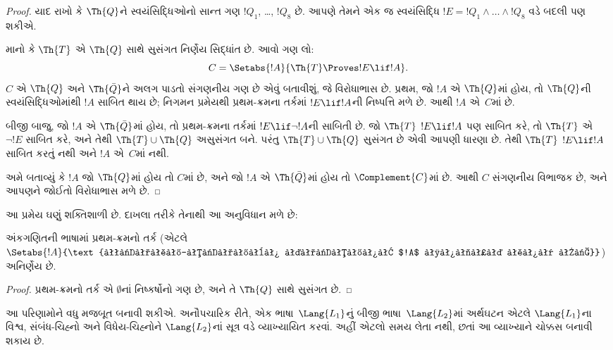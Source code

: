 \begin{proof}
યાદ રાખો કે $\Th{Q}$ને
સ્વયંસિદ્ધિઓનો સાન્ત ગણ
$!Q_1$, \dots,
$!Q_8$ છે. આપણે તેમને
એક જ સ્વયંસિદ્ધિ
$!E = !Q_1 \land
\dots \land !Q_8$ વડે
બદલી પણ શકીએ.

માનો કે $\Th{T}$ એ
$\Th{Q}$ સાથે સુસંગત
નિર્ણેય સિદ્ધાંત છે.
આવો ગણ લો:
\[
C = \Setabs{!A}{\Th{T} \Proves !E \lif !A}.
\]
$C$ એ $\Th{Q}$ અને
$\Th{\bar Q}$ને અલગ પાડતો
સંગણનીય ગણ છે એવું બતાવીશું,
જે વિરોધાભાસ છે. પ્રથમ,
જો $!A$ એ $\Th{Q}$માં
હોય, તો $\Th{Q}$ની
સ્વયંસિદ્ધિઓમાંથી $!A$
સાબિત થાય છે; નિગમન
પ્રમેયથી પ્રથમ-ક્રમના
તર્કમાં $!E \lif !A$ની
નિષ્પત્તિ મળે છે.
આથી $!A$ એ~$C$માં છે.

બીજી બાજુ, જો $!A$ એ
$\Th{\bar Q}$માં હોય,
તો પ્રથમ-ક્રમના તર્કમાં
$!E \lif \lnot !A$ની
સાબિતી છે. જો $\Th{T}$
$!E \lif !A$ પણ સાબિત
કરે, તો $\Th{T}$ એ
$\lnot !E$ સાબિત કરે,
અને તેથી $\Th{T}
\cup \Th{Q}$ અસુસંગત બને.
પરંતુ $\Th{T} \cup \Th{Q}$
સુસંગત છે એવી આપણી
ધારણા છે. તેથી $\Th{T}$
$!E \lif !A$ સાબિત કરતું
નથી અને $!A$ એ~$C$માં
નથી.

અમે બતાવ્યું કે $!A$ જો
$\Th{Q}$માં હોય તો $C$માં
છે, અને જો $!A$ એ
$\Th{\bar Q}$માં હોય તો
$\Complement{C}$માં છે.
આથી $C$ સંગણનીય વિભાજક
છે, અને આપણને જોઈતો
વિરોધાભાસ મળે છે.
\end{proof}

આ પ્રમેય ઘણું શક્તિશાળી છે.
દાખલા તરીકે તેનાથી આ
અનુવિધાન મળે છે:

\begin{cor}
  અંકગણિતની ભાષામાં
  પ્રથમ-ક્રમનો તર્ક (એટલે
  $\Setabs{!A}{\text{પ્રથમ-ક્રમના તર્કમાં $!A$ સાબિત થાય છે}}$)
  અનિર્ણેય છે.
\end{cor}

\begin{proof}
પ્રથમ-ક્રમનો તર્ક એ
$\emptyset$નાં નિષ્કર્ષોનો
ગણ છે, અને તે
$\Th{Q}$ સાથે સુસંગત છે.
\end{proof}
\endgroup


\begingroup
\makeatletter{}\makeatother


\label{guunit:OLP-0311}


આ પરિણામોને વધુ મજબૂત
બનાવી શકીએ. અનૌપચારિક રીતે,
એક ભાષા~$\Lang{L_1}$નું
બીજી ભાષા~$\Lang{L_2}$માં
અર્થઘટન એટલે
$\Lang{L_1}$ના વિશ્વ,
સંબંધ-ચિહ્નો અને
વિધેય-ચિહ્નોને
$\Lang{L_2}$નાં
સૂત્ર વડે વ્યાખ્યાયિત
કરવાં. અહીં એટલો સમય
લેતા નથી, છતાં આ
વ્યાખ્યાને ચોક્કસ બનાવી
શકાય છે.

